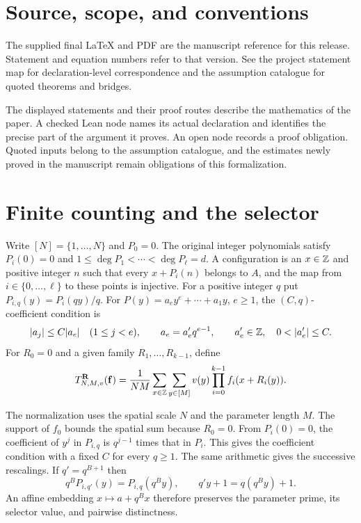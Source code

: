 \section{Source, scope, and conventions}

The supplied final LaTeX and PDF are the manuscript reference for this
release. Statement and equation numbers refer to that version.
See the project statement map for declaration-level correspondence and
the assumption catalogue for quoted theorems and bridges.

The displayed statements and their proof routes describe the mathematics
of the paper. A checked Lean node names its actual declaration and
identifies the precise part of the argument it proves. An open node
records a proof obligation. Quoted inputs belong to the assumption
catalogue, and the estimates newly proved in the manuscript remain
obligations of this formalization.

\printgraph

\section{Finite counting and the selector}

\begin{definition}\label{d:Cq}
Write $[N]=\{1,\ldots,N\}$ and $P_0=0$. The original integer
polynomials satisfy $P_i(0)=0$ and
$1\le \deg P_1<\cdots<\deg P_\ell=d$. A configuration is an $x\in\mathbb Z$
and positive integer $n$ such that every $x+P_i(n)$ belongs to $A$,
and the map from $i\in\{0,\ldots,\ell\}$ to these points is injective.
For a positive integer $q$ put $P_{i,q}(y)=P_i(qy)/q$.
For $P(y)=a_ey^e+\cdots+a_1y$, $e\ge1$, the $(C,q)$-coefficient
condition is
\[
 |a_j|\le C|a_e|\quad(1\le j<e),\qquad
 a_e=a'_e q^{e-1},\qquad a'_e\in\Z,\quad 0<|a'_e|\le C.
\]
For $R_0=0$ and a given family $R_1,\ldots,R_{k-1}$, define
\[
 T^{\mathbf R}_{N,M,v}(\mathbf f)
 =\frac{1}{NM}\sum_{x\in\mathbb Z}\sum_{y\in[M]}
       v(y)\prod_{i=0}^{k-1} f_i(x+R_i(y)).
\]
\end{definition}

The normalization uses the spatial scale $N$ and the parameter length $M$.
The support of $f_0$ bounds the spatial sum because $R_0=0$.
From $P_i(0)=0$, the coefficient of $y^j$ in $P_{i,q}$ is $q^{j-1}$
times that in $P_i$. This gives the coefficient condition with a fixed
$C$ for every $q\ge1$. The same arithmetic gives the successive
rescalings. If $q'=q^{B+1}$ then
\[
 q^B P_{i,q'}(y)=P_{i,q}(q^B y),\qquad
 q'y+1=q(q^B y)+1.
\]
An affine embedding $x\mapsto a+q^B x$ therefore preserves the parameter
prime, its selector value, and pairwise distinctness.

